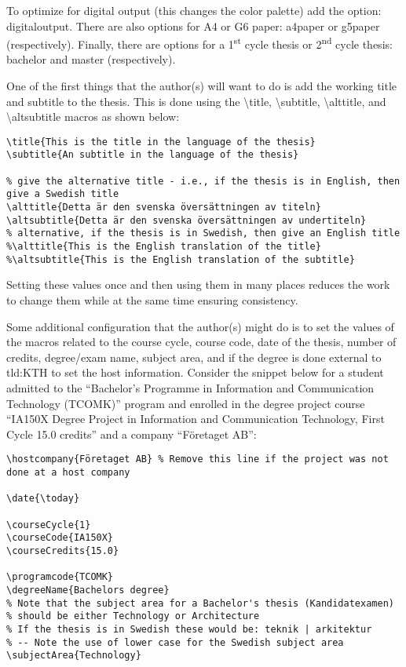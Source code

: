 To optimize for digital output (this changes the color palette) add the option: digitaloutput. There are also options for A4 or G6 paper: a4paper or g5paper (respectively). Finally, there are options for a 1\textsuperscript{st} cycle thesis or 2\textsuperscript{nd} cycle thesis: bachelor and master (respectively).

One of the first things that the author(s) will want to do is add the working title and subtitle to the thesis. This is done using the \textbackslash title, \textbackslash subtitle, \textbackslash alttitle, and \textbackslash altsubtitle macros as shown below:
\begin{lstlisting}
\title{This is the title in the language of the thesis}
\subtitle{An subtitle in the language of the thesis}

% give the alternative title - i.e., if the thesis is in English, then give a Swedish title
\alttitle{Detta är den svenska översättningen av titeln}
\altsubtitle{Detta är den svenska översättningen av undertiteln}
% alternative, if the thesis is in Swedish, then give an English title
%\alttitle{This is the English translation of the title}
%\altsubtitle{This is the English translation of the subtitle}   
\end{lstlisting}

Setting these values once and then using them in many places reduces the work to change them while at the same time ensuring consistency. 

Some additional configuration that the author(s) might do is to set the values of the macros related to the course cycle, course code, date of the thesis, number of credits, degree/exam name, subject area, and if the degree is done external to \gls{tld:KTH} to set the host information. Consider the snippet below for a student admitted to the ``Bachelor's Programme in Information and Communication Technology (TCOMK)'' program and enrolled in the degree project course ``IA150X Degree Project in Information and Communication Technology, First Cycle 15.0 credits'' and a company ``Företaget AB'':
\begin{lstlisting}
\hostcompany{Företaget AB} % Remove this line if the project was not done at a host company

\date{\today}

\courseCycle{1}
\courseCode{IA150X}
\courseCredits{15.0}

\programcode{TCOMK}
\degreeName{Bachelors degree}
% Note that the subject area for a Bachelor's thesis (Kandidatexamen)
% should be either Technology or Architecture
% If the thesis is in Swedish these would be: teknik | arkitektur
% -- Note the use of lower case for the Swedish subject area
\subjectArea{Technology}
\end{lstlisting}

